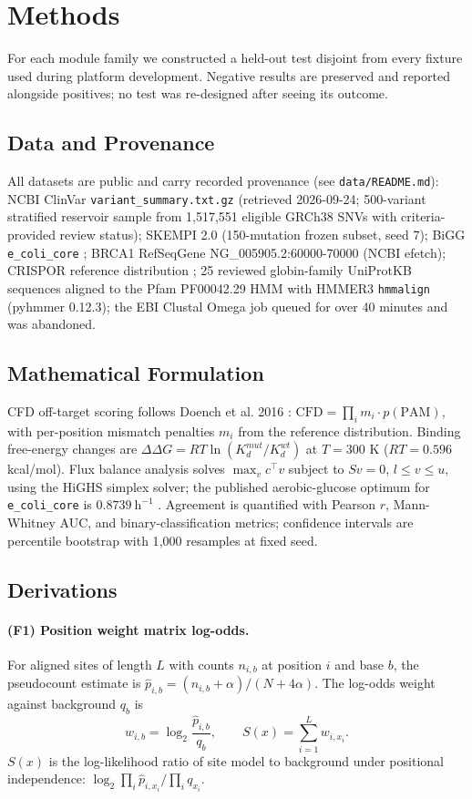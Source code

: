 \documentclass[11pt]{article}
\begin{document}
\section{Methods}
For each module family we constructed a held-out test disjoint from every
fixture used during platform development. Negative results are preserved and
reported alongside positives; no test was re-designed after seeing its outcome.
\subsection{Data and Provenance}
All datasets are public and carry recorded provenance (see
\texttt{data/README.md}): NCBI ClinVar \texttt{variant\_summary.txt.gz}
(retrieved 2026-09-24; 500-variant stratified reservoir sample from
1{,}517{,}551 eligible GRCh38 SNVs with criteria-provided review status);
SKEMPI 2.0 \cite{skempi} (150-mutation frozen subset, seed 7); BiGG
\texttt{e\_coli\_core} \cite{bigg}; BRCA1 RefSeqGene NG\_005905.2:60000-70000
(NCBI efetch); CRISPOR reference distribution \cite{crispor}; 25 reviewed
globin-family UniProtKB sequences aligned to the Pfam PF00042.29 HMM with
HMMER3 \texttt{hmmalign} (pyhmmer 0.12.3); the EBI Clustal Omega job queued
for over 40 minutes and was abandoned.
\subsection{Mathematical Formulation}
CFD off-target scoring follows Doench et al. 2016 \cite{doench2016}:
$\mathrm{CFD} = \prod_i m_i \cdot p(\mathrm{PAM})$, with per-position
mismatch penalties $m_i$ from the reference distribution. Binding free-energy
changes are $\Delta\Delta G = RT\ln(K_d^{mut}/K_d^{wt})$ at $T=300$ K
($RT = 0.596$ kcal/mol). Flux balance analysis solves
$\max_v c^\top v$ subject to $Sv = 0$, $l \le v \le u$, using the HiGHS
simplex solver; the published aerobic-glucose optimum for
\texttt{e\_coli\_core} is $0.8739\ \mathrm{h^{-1}}$ \cite{bigg}. Agreement is
quantified with Pearson $r$, Mann-Whitney AUC, and binary-classification
metrics; confidence intervals are percentile bootstrap with 1{,}000 resamples
at fixed seed.
\subsection{Derivations}
\paragraph{(F1) Position weight matrix log-odds.} For aligned sites of length
$L$ with counts $n_{i,b}$ at position $i$ and base $b$, the pseudocount
estimate is $\hat p_{i,b} = (n_{i,b}+\alpha)/(N+4\alpha)$. The log-odds weight
against background $q_b$ is
\begin{equation}
w_{i,b} = \log_2 \frac{\hat p_{i,b}}{q_b}, \qquad
S(x) = \sum_{i=1}^{L} w_{i,x_i}.
\end{equation}
$S(x)$ is the log-likelihood ratio of site model to background under
positional independence: $\log_2 \prod_i \hat p_{i,x_i} / \prod_i q_{x_i}$.
\end{document}
